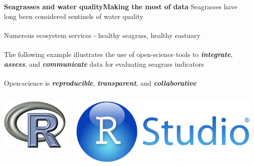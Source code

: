 \documentclass[serif]{beamer}\usepackage[]{graphicx}\usepackage[]{color}
\newcommand{\emtxt}[1]{\textbf{\textit{#1}}}
\begin{document}
\begin{frame}{\textbf{Seagrasses and water quality}}{\textbf{Making the most of data}}
\onslide<+->
Seagrasses have long been considered sentinels of water quality \scriptsize \cite{Short96}\\~\\
\normalsize
Numerous ecosystem services - healthy seagrass, healthy eastuary \\~\\
The following example illustrates the use of open-science tools to \emtxt{integrate}, \emtxt{assess}, and \emtxt{communicate} data for evaluating seagrass indicators \\~\\
\onslide<+->
Open-science is \emtxt{reproducible}, \emtxt{transparent}, and \emtxt{collaborative} \scriptsize \cite{Molloy09} \normalsize
\begin{columns}
\begin{column}{0.2\textwidth}
\centerline{\includegraphics[width = \textwidth]{fig/Rlogo.png}}
\end{column}
\begin{column}{0.2\textwidth}
\centerline{\includegraphics[width = \textwidth]{fig/RStudio.png}}

\end{column}
\end{columns}
\end{frame}
\end{document}
